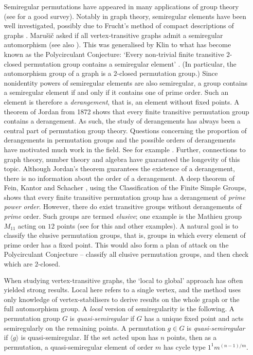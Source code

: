\documentclass{article}
\theoremstyle{remark}
\theoremstyle{definition}
\newcommand{\qsr}{quasi-semiregular}
\newcommand{\qsre}{quasi-semiregular element}
\begin{document}
 \quad Semiregular permutations have appeared in many applications of group theory (see  \cite{PabloSurvey} for a good survey). Notably in graph theory, semiregular elements have been well investigated, possibly due to Frucht's method of compact descriptions of graphs \cite{Frucht}.  Maru\v{s}i\v{c} \cite[Problem 2.4]{MarusicPolyCirc} asked if all vertex-transitive graphs admit a semiregular automorphism (see also \cite{JordanPC,Leighton}). This was generalised by Klin \cite{Klin} to what has become known as the Polycirculant Conjecture: `Every non-trivial finite transitive $2$-closed permutation group contains a semiregular element' \cite{7author}. (In particular, the automorphism group of a graph is a $2$-closed permutation group.) Since nonidentity powers of semiregular elements are also semiregular, a group contains a semiregular element if and only if it contains one of prime order. Such an element is therefore a \emph{derangement}, that is, an element without fixed points. A theorem of Jordan from 1872  \cite{Jordan}  shows that every finite transitive permutation group contains a {derangement}.  As such, the study of derangements has always been a central part of permutation group theory. Questions concerning the proportion of derangements in permutation groups and the possible orders of derangements have motivated much work in the field. See for example \cite{Serre}. Further,  connections to graph theory, number theory and algebra have guaranteed the longevity of this topic. Although Jordan's theorem guarantees the existence of a derangement, there is no information about the order of a derangement. A deep theorem of Fein, Kantor and Schacher \cite{FKS}, using the Classification of the Finite Simple Groups, shows that every finite transitive permutation group has a derangement of \emph{prime power order}. However, there do exist transitive groups without derangements of \emph{prime} order. Such groups are termed \emph{elusive}; one example is the Mathieu group $M_{11}$ acting on $12$ points (see \cite[\S2]{7author} for this and other examples). A natural goal is to classify the elusive permutation groups, that is, groups in which every element of prime order has a fixed point. This would also form a plan of attack on the Polycirculant Conjecture -- classify all elusive permutation groups, and then check which are $2$-closed.

\medskip

 \quad When studying vertex-transitive graphs, the `local to global' approach has often yielded strong results. Local here refers to a single vertex, and the method uses only knowledge of vertex-stabilisers to derive results on the whole graph or the full automorphism group. A \emph{local} version of semiregularity is the following. A permutation group $G$   is \emph{\qsr} if $G$ has a unique fixed point   and acts semiregularly on the remaining points. A permutation $g\in G$ is \emph{\qsr} if $\langle g \rangle$  is {\qsr}.  If the set acted upon has $n$ points, then as a permutation, a {\qsre} of order $m$ has cycle type $1^1m^{(n-1)/m}$. 
 
\end{document}
